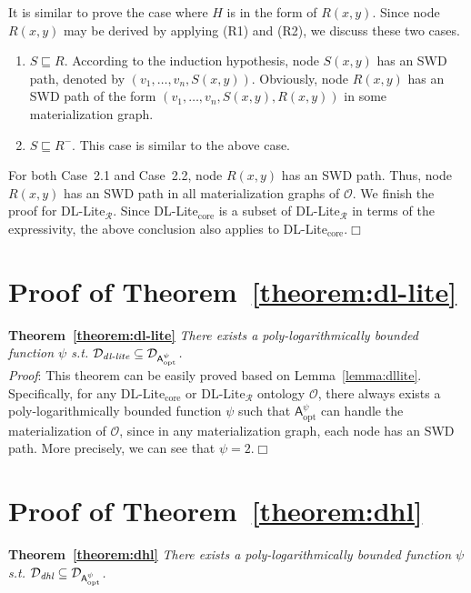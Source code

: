 It is similar to prove the case where $H$ is in the form of $R(x,y)$.
Since node $R(x,y)$ may be derived by
applying (R1) and (R2), we discuss these two cases.

\begin{enumerate}[leftmargin=12ex,label=Case~2.\arabic*]
\item $S\sqsubseteq R$. According to the induction hypothesis,
node $S(x,y)$ has an SWD path, denoted by $(v_1,\ldots ,v_n,S(x,y))$.
Obviously, node $R(x,y)$
has an SWD path of the form $(v_1,\ldots ,v_n,S(x,y),R(x,y))$
in some materialization graph.

\item $S\sqsubseteq R^-$. This case is similar to
the above case.
\end{enumerate}

For both Case~2.1 and Case~2.2, node $R(x,y)$ has an SWD path. Thus,
node $R(x,y)$ has an SWD path in all materialization graphs of $\mathcal{O}$.
We finish the proof for DL-Lite$_\mathcal{R}$. Since
DL-Lite$_{\text{core}}$ is a subset of DL-Lite$_\mathcal{R}$
in terms of the expressivity, the above conclusion also applies
to DL-Lite$_{\text{core}}$.\hfill$\Box$


\section{Proof of Theorem~\ref{theorem:dl-lite}}

\textbf{Theorem~\ref{theorem:dl-lite}}
\emph{There exists a poly-logarithmically bounded function $\psi$ s.t.
$\mathcal{D}_{\textit{\text{dl-lite}}}\subseteq\mathcal{D}_{\mathsf{A}_{\text{opt}}^{\psi}}$.}\\

\noindent\emph{Proof}: This theorem can be easily proved based on Lemma~\ref{lemma:dllite}.
Specifically, for any DL-Lite$_{\text{core}}$ or DL-Lite$_\mathcal{R}$ ontology $\mathcal{O}$,
there always exists a poly-logarithmically bounded function $\psi$ such that
$\mathsf{A}_{\text{opt}}^{\psi}$ can handle the materialization of $\mathcal{O}$,
since in any materialization graph, each node has an SWD path.
More precisely, we can see that $\psi=2$.\hfill$\Box$


\section{Proof of Theorem~\ref{theorem:dhl}}

\textbf{Theorem~\ref{theorem:dhl}}
\emph{There exists a poly-logarithmically bounded function $\psi$ s.t.
$\mathcal{D}_{\textit{\text{dhl}}}\subseteq\mathcal{D}_{\mathsf{A}_{\text{opt}}^{\psi}}$.}\\

